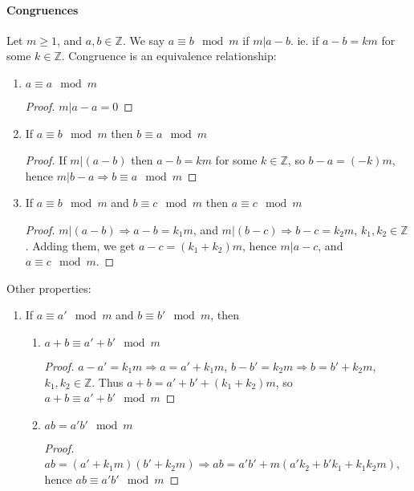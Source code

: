 \documentclass[10pt,letter]{article}
\theoremstyle{plain}
\theoremstyle{definition}
\begin{document}
\paragraph{Congruences}
Let $m\geq1$, and $a,b\in\mathbb{Z}$. We say $a\equiv b\mod{m}$ if $m|a-b$. ie. if $a-b=km$ for some $k\in\mathbb{Z}$. Congruence is an equivalence relationship: 
\begin{enumerate}
    \item $a\equiv a\mod{m}$ 
    \begin{proof}
    $m|a-a=0$
    \end{proof}
    \item If $a\equiv b\mod{m}$ then $b\equiv a\mod{m}$ 
    \begin{proof}
    If $m|(a-b)$ then $a-b=km$ for some $k\in\mathbb{Z}$, so $b-a=(-k)m$, hence $m|b-a\Rightarrow b\equiv a\mod{m}$
    \end{proof}
    \item If $a\equiv b\mod{m}$ and $b\equiv c\mod{m}$ then $a\equiv c\mod{m}$ 
    \begin{proof}
    $m|(a-b)\Rightarrow a-b=k_1m$, and $m|(b-c)\Rightarrow b-c=k_2m$, $k_1,k_2\in\mathbb{Z}$. Adding them, we get $a-c=(k_1+k_2)m$, hence $m|a-c$, and $a\equiv c\mod{m}$.
    \end{proof}
\end{enumerate}
Other properties: 
\begin{enumerate}
    \item If $a\equiv a'\mod{m}$ and $b\equiv b'\mod{m}$, then 
    \begin{enumerate}
        \item $a+b\equiv a'+b'\mod{m}$ 
        \begin{proof}
        $a-a'=k_1m\Rightarrow a=a'+k_1m$, $b-b'=k_2m\Rightarrow b=b'+k_2m$, $k_1,k_2\in\mathbb{Z}$. Thus $a+b=a'+b'+(k_1+k_2)m$, so $a+b\equiv a'+b'\mod{m}$ 
        \end{proof}
        \item $ab=a'b'\mod{m}$
        \begin{proof}
        $ab=(a'+k_1m)(b'+k_2m)\Rightarrow ab=a'b'+m(a'k_2+b'k_1+k_1k_2m)$, hence $ab\equiv a'b'\mod{m}$ 
        \end{proof}
    \end{enumerate}
\end{enumerate}
\end{document}
